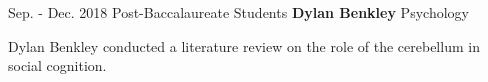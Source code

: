 \begin{cventries}
  \cventry
    {Sep. - Dec. 2018} %
    {Post-Baccalaureate Students} %
    {\textbf{Dylan Benkley}}
    {Psychology}
   {
      \begin{cvitems} %
        \item {Dylan Benkley conducted a literature review on the role of the cerebellum in social cognition.}
      \end{cvitems}
    }

\end{cventries}
